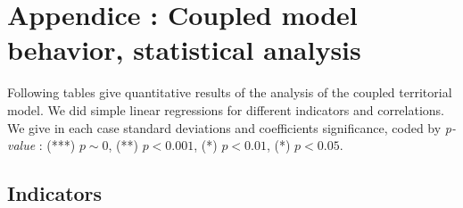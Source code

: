 



\footnotesize








\newpage

\normalsize




\section*{Appendice : Coupled model behavior, statistical analysis}

Following tables give quantitative results of the analysis of the coupled territorial model. We did simple linear regressions for different indicators and correlations. We give in each case standard deviations and coefficients significance, coded by \emph{p-value} : (***) $p\sim 0$, (**) $p<0.001$, (*) $p<0.01$, (*) $p<0.05$.


\subsection*{Indicators}

